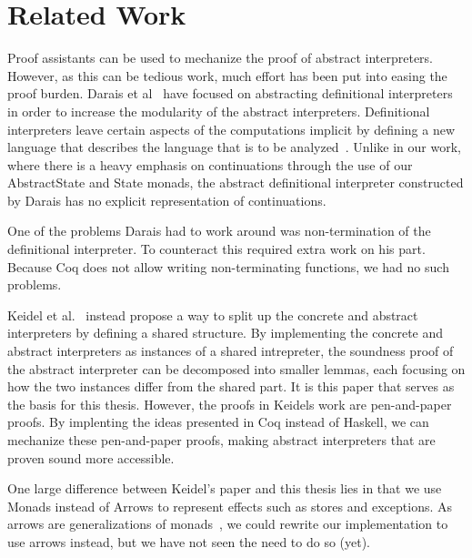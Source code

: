 \section{Related Work}

%
Proof assistants can be used to mechanize the proof of abstract interpreters.
However, as this can be tedious work, much effort has been put into easing the
proof burden. Darais et al~\cite{darais2017abstracting} have focused on
abstracting definitional interpreters in order to increase the modularity of
the abstract interpreters. Definitional interpreters leave certain aspects of
the computations implicit by defining a new language that describes the
language that is to be analyzed~\cite{reynolds1972definitional}. Unlike in our
work, where there is a heavy emphasis on continuations through the use of our
AbstractState and State monads, the abstract definitional interpreter
constructed by Darais has no explicit representation of continuations.

One of the problems Darais had to work around was non-termination of the
definitional interpreter. To counteract this required extra work on his part.
Because Coq does not allow writing non-terminating functions, we had no such
problems.

Keidel et al.~\cite{keidel2018compositional} instead propose a way to split up
the concrete and abstract interpreters by defining a shared structure. By
implementing the concrete and abstract interpreters as instances of a shared
intrepreter, the soundness proof of the abstract interpreter can be decomposed
into smaller lemmas, each focusing on how the two instances differ from the
shared part. It is this paper that serves as the basis for this thesis. However,
the proofs in Keidels work are pen-and-paper proofs. By implenting the ideas
presented in Coq instead of Haskell, we can mechanize these pen-and-paper
proofs, making abstract interpreters that are proven sound more accessible.

One large difference between Keidel's paper and this thesis lies in that we use
Monads instead of Arrows to represent effects such as stores and exceptions. As
arrows are generalizations of monads~\cite{hughes2000generalising}, we could
rewrite our implementation to use arrows instead, but we have not seen the need
to do so (yet).
